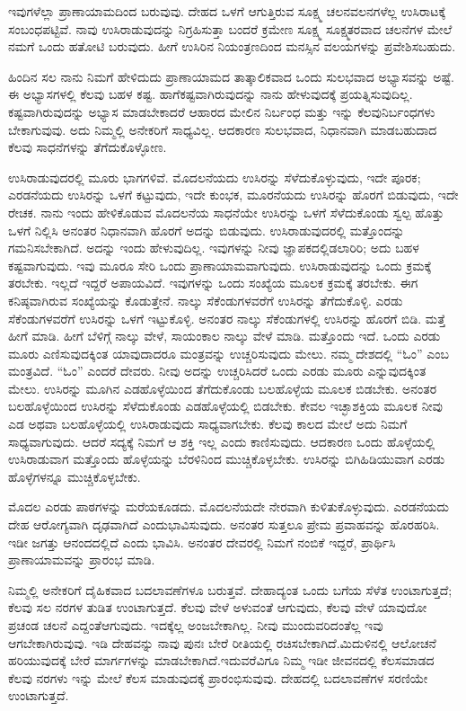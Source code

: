 ಇವುಗಳೆಲ್ಲಾ ಪ್ರಾಣಾಯಾಮದಿಂದ ಬರುವುವು. ದೇಹದ ಒಳಗೆ ಆಗುತ್ತಿರುವ ಸೂಕ್ಷ್ಮ ಚಲನವಲನಗಳೆಲ್ಲ ಉಸಿರಾಟಕ್ಕೆ ಸಂಬಂಧಪಟ್ಟಿವೆ. ನಾವು ಉಸಿರಾಡುವುದನ್ನು ನಿಗ್ರಹಿಸುತ್ತಾ ಬಂದರೆ ಕ್ರಮೇಣ ಸೂಕ್ಷ್ಮ ಸೂಕ್ಷ್ಮತರವಾದ ಚಲನೆಗಳ ಮೇಲೆ ನಮಗೆ ಒಂದು ಹತೋಟಿ ಬರುವುದು. ಹೀಗೆ ಉಸಿರಿನ ನಿಯಂತ್ರಣದಿಂದ ಮನಸ್ಸಿನ ವಲಯಗಳನ್ನು ಪ್ರವೇಶಿಸಬಹುದು.

ಹಿಂದಿನ ಸಲ ನಾನು ನಿಮಗೆ ಹೇಳಿದುದು ಪ್ರಾಣಾಯಾಮದ ತಾತ್ಕಾಲಿಕವಾದ ಒಂದು ಸುಲಭವಾದ ಅಭ್ಯಾಸವನ್ನು ಅಷ್ಟೆ. ಈ ಅಭ್ಯಾಸಗಳಲ್ಲಿ ಕೆಲವು ಬಹಳ ಕಷ್ಟ. ಹಾಗೆ\break ಕಷ್ಟವಾಗಿರುವುದನ್ನು ನಾನು ಹೇಳುವುದಕ್ಕೆ ಪ್ರಯತ್ನಿಸುವುದಿಲ್ಲ. ಕಷ್ಟವಾಗಿರುವುದನ್ನು ಅಭ್ಯಾಸ ಮಾಡಬೇಕಾದರೆ ಆಹಾರದ ಮೇಲಿನ ನಿರ್ಬಂಧ ಮತ್ತು ಇನ್ನು ಕೆಲವು\break ನಿರ್ಬಂಧಗಳು ಬೇಕಾಗುವುವು. ಅದು ನಿಮ್ಮಲ್ಲಿ ಅನೇಕರಿಗೆ ಸಾಧ್ಯವಿಲ್ಲ. ಆದಕಾರಣ ಸುಲಭವಾದ, ನಿಧಾನವಾಗಿ ಮಾಡಬಹುದಾದ ಕೆಲವು ಸಾಧನೆಗಳನ್ನು ತೆಗೆದುಕೊಳ್ಳೋಣ.

ಉಸಿರಾಡುವುದರಲ್ಲಿ ಮೂರು ಭಾಗಗಳಿವೆ. ಮೊದಲನೆಯದು ಉಸಿರನ್ನು ಸೆಳೆದುಕೊಳ್ಳುವುದು, ಇದೇ ಪೂರಕ; ಎರಡನೆಯದು ಉಸಿರನ್ನು ಒಳಗೆ ಕಟ್ಟುವುದು, ಇದೇ ಕುಂಭಕ, ಮೂರನೆಯದು ಉಸಿರನ್ನು ಹೊರಗೆ ಬಿಡುವುದು, ಇದೇ ರೇಚಕ. ನಾನು ಇಂದು ಹೇಳಿಕೊಡುವ ಮೊದಲನೆಯ ಸಾಧನೆಯೇ ಉಸಿರನ್ನು ಒಳಗೆ ಸೆಳೆದುಕೊಂಡು ಸ್ವಲ್ಪ ಹೊತ್ತು ಒಳಗೆ ನಿಲ್ಲಿಸಿ ಅನಂತರ ನಿಧಾನವಾಗಿ ಹೊರಗೆ ಅದನ್ನು ಬಿಡುವುದು. ಉಸಿರಾಡುವುದರಲ್ಲಿ ಮತ್ತೊಂದನ್ನು ಗಮನಿಸಬೇಕಾಗಿದೆ. ಅದನ್ನು ಇಂದು ಹೇಳುವುದಿಲ್ಲ. ಇವುಗಳನ್ನು ನೀವು ಜ್ಞಾಪಕದಲ್ಲಿಡಲಾರಿರಿ; ಅದು ಬಹಳ ಕಷ್ಟವಾಗುವುದು. ಇವು ಮೂರೂ ಸೇರಿ ಒಂದು ಪ್ರಾಣಾಯಾಮವಾಗುವುದು. ಉಸಿರಾಡುವುದನ್ನು ಒಂದು ಕ್ರಮಕ್ಕೆ ತರಬೇಕು. ಇಲ್ಲದೆ ಇದ್ದರೆ ಅಪಾಯವಿದೆ. ಇವುಗಳನ್ನು ಒಂದು ಸಂಖ್ಯೆಯ ಮೂಲಕ ಕ್ರಮಕ್ಕೆ ತರಬೇಕು. ಈಗ ಕನಿಷ್ಠವಾಗಿರುವ ಸಂಖ್ಯೆಯನ್ನು ಕೊಡುತ್ತೇನೆ. ನಾಲ್ಕು ಸೆಕೆಂಡುಗಳವರೆಗೆ ಉಸಿರನ್ನು ತೆಗೆದುಕೊಳ್ಳಿ. ಎರಡು ಸೆಕೆಂಡುಗಳವರೆಗೆ ಉಸಿರನ್ನು ಒಳಗೆ ಇಟ್ಟುಕೊಳ್ಳಿ. ಅನಂತರ ನಾಲ್ಕು ಸೆಕೆಂಡುಗಳಲ್ಲಿ ಉಸಿರನ್ನು ಹೊರಗೆ ಬಿಡಿ. ಮತ್ತೆ ಹೀಗೆ ಮಾಡಿ. ಹೀಗೆ ಬೆಳಿಗ್ಗೆ ನಾಲ್ಕು ವೇಳೆ, ಸಾಯಂಕಾಲ ನಾಲ್ಕು ವೇಳೆ ಮಾಡಿ. ಮತ್ತೊಂದು ಇದೆ. ಒಂದು ಎರಡು ಮೂರು ಎಣಿಸುವುದಕ್ಕಿಂತ ಯಾವುದಾದರೂ ಮಂತ್ರವನ್ನು ಉಚ್ಚರಿಸುವುದು ಮೇಲು. ನಮ್ಮ ದೇಶದಲ್ಲಿ “ಓಂ” ಎಂಬ ಮಂತ್ರವಿದೆ. “ಓಂ” ಎಂದರೆ ದೇವರು. ನೀವು ಅದನ್ನು ಉಚ್ಚರಿಸಿದರೆ ಒಂದು ಎರಡು ಮೂರು ಎನ್ನುವುದಕ್ಕಿಂತ ಮೇಲು. ಉಸಿರನ್ನು ಮೂಗಿನ ಎಡಹೊಳ್ಳೆಯಿಂದ ತೆಗೆದುಕೊಂಡು ಬಲಹೊಳ್ಳೆಯ ಮೂಲಕ ಬಿಡಬೇಕು. ಅನಂತರ ಬಲಹೊಳ್ಳೆಯಿಂದ ಉಸಿರನ್ನು ಸೆಳೆದುಕೊಂಡು ಎಡಹೊಳ್ಳೆಯಲ್ಲಿ ಬಿಡಬೇಕು. ಕೇವಲ ಇಚ್ಛಾಶಕ್ತಿಯ ಮೂಲಕ ನೀವು ಎಡ ಅಥವಾ ಬಲಹೊಳ್ಳೆಯಲ್ಲಿ ಉಸಿರಾಡುವುದು ಸಾಧ್ಯವಾಗಬೇಕು. ಕೆಲವು ಕಾಲದ ಮೇಲೆ ಅದು ನಿಮಗೆ ಸಾಧ್ಯವಾಗುವುದು. ಆದರೆ ಸದ್ಯಕ್ಕೆ ನಿಮಗೆ ಆ ಶಕ್ತಿ ಇಲ್ಲ ಎಂದು ಕಾಣಿಸುವುದು. ಆದಕಾರಣ ಒಂದು ಹೊಳ್ಳೆಯಲ್ಲಿ ಉಸಿರಾಡುವಾಗ ಮತ್ತೊಂದು ಹೊಳ್ಳೆಯನ್ನು ಬೆರಳಿನಿಂದ ಮುಚ್ಚಿಕೊಳ್ಳಬೇಕು. ಉಸಿರನ್ನು ಬಿಗಿಹಿಡಿಯುವಾಗ ಎರಡು ಹೊಳ್ಳೆಗಳನ್ನೂ ಮುಚ್ಚಿಕೊಳ್ಳಬೇಕು.

ಮೊದಲ ಎರಡು ಪಾಠಗಳನ್ನು ಮರೆಯಕೂಡದು. ಮೊದಲನೆಯದೇ ನೇರವಾಗಿ ಕುಳಿತುಕೊಳ್ಳುವುದು. ಎರಡನೆಯದು ದೇಹ ಆರೋಗ್ಯವಾಗಿ ದೃಢವಾಗಿದೆ ಎಂದು\break ಭಾವಿಸುವುದು. ಅನಂತರ ಸುತ್ತಲೂ ಪ್ರೇಮ ಪ್ರವಾಹವನ್ನು ಹೊರಹರಿಸಿ. ಇಡೀ ಜಗತ್ತು ಆನಂದದಲ್ಲಿದೆ ಎಂದು ಭಾವಿಸಿ. ಅನಂತರ ದೇವರಲ್ಲಿ ನಿಮಗೆ ನಂಬಿಕೆ ಇದ್ದರೆ, ಪ್ರಾರ್ಥಿಸಿ ಪ್ರಾಣಾಯಾಮವನ್ನು ಪ್ರಾರಂಭ ಮಾಡಿ.

ನಿಮ್ಮಲ್ಲಿ ಅನೇಕರಿಗೆ ದೈಹಿಕವಾದ ಬದಲಾವಣೆಗಳೂ ಬರುತ್ತವೆ. ದೇಹಾದ್ಯಂತ ಒಂದು ಬಗೆಯ ಸೆಳೆತ ಉಂಟಾಗುತ್ತದೆ; ಕೆಲವು ಸಲ ನರಗಳ ತುಡಿತ ಉಂಟಾಗುತ್ತದೆ. ಕೆಲವು ವೇಳೆ ಅಳುವಂತೆ ಆಗುವುದು, ಕೆಲವು ವೇಳೆ ಯಾವುದೋ ಪ್ರಚಂಡ ಚಲನೆ ಎದ್ದಂತೆ\break ಆಗುವುದು. ಇದಕ್ಕೆಲ್ಲ ಅಂಜಬೇಕಾಗಿಲ್ಲ. ನೀವು ಮುಂದುವರಿದಂತೆಲ್ಲ ಇವು ಆಗಬೇಕಾ\break ಗಿರುವುವು. ಇಡಿ ದೇಹವನ್ನು ನಾವು ಪುನಃ ಬೇರೆ ರೀತಿಯಲ್ಲಿ ರಚಿಸಬೇಕಾಗಿದೆ.\break ಮಿದುಳಿನಲ್ಲಿ ಆಲೋಚನೆ ಹರಿಯುವುದಕ್ಕೆ ಬೇರೆ ಮಾರ್ಗಗಳನ್ನು ಮಾಡಬೇಕಾಗಿದೆ.\break ಇದುವರೆವಿಗೂ ನಿಮ್ಮ ಇಡೀ ಜೀವನದಲ್ಲಿ ಕೆಲಸಮಾಡದ ಕೆಲವು ನರಗಳು ಇನ್ನು ಮೇಲೆ ಕೆಲಸ ಮಾಡುವುದಕ್ಕೆ ಪ್ರಾರಂಭಿಸುವುವು. ದೇಹದಲ್ಲಿ ಬದಲಾವಣೆಗಳ ಸರಣಿಯೇ ಉಂಟಾಗುತ್ತದೆ.

\vskip -0.5cm

